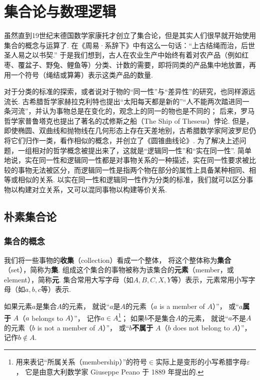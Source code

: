 \chapter{集合论与数理逻辑}
虽然直到19世纪末德国数学家康托才创立了集合论，但是其实人们很早就开始使用集合的概念与运算了.
在《周易·系辞下》中有这么一句话：“上古结绳而治，后世圣人易之以书契.”
于是我们想到，古人在农业生产中始终有着对农产品（例如红枣、覆盆子、野兔、鲤鱼等）分类、计数的需要，即将同类的产品集中地放置，再用一个符号（绳结或算筹）表示这类产品的数量.

对于分类的标准的探索，或者说对于物的“同一性”与“差异性”的研究，也同样源远流长.
古希腊哲学家赫拉克利特也提出“太阳每天都是新的”“人不能两次踏进同一条河流”，并认为事物总是在变化的，观念上的同一的物也是不同的；
后来，罗马哲学家普鲁塔克也提出了著名的忒修斯之船（The Ship of Theseus）悖论.
但是，即使椭圆、双曲线和抛物线在几何形态上存在天差地别，古希腊数学家阿波罗尼仍将它们归作一类，看作相似的概念，并创立了《圆锥曲线论》.
为了解决上述问题，一组相对的哲学概念被提出来了，这就是“逻辑同一性”和“实在同一性”.
简单地说，实在同一性和逻辑同一性都是对事物关系的一种描述，实在同一性要求被比较的事物无法被区分，而逻辑同一性是指两个物在部分的属性上具备某种相同、相等或相似的关系.
以实在同一性和逻辑同一性作为分类的标准，我们就可以区分事物以构建对立关系，又可以混同事物以构建等价关系.

\section{朴素集合论}
\subsection{集合的概念}
\begin{definition}
我们将一些事物的\textbf{收集}（collection）看成一个整体，%
将这个整体称为\textbf{集合}（set），简称为\textbf{集}.
组成这个集合的事物被称为该集合的\textbf{元素}（member，或element），简称\textbf{元}.
集合常用大写字母（如\(A,B,C,X,Y\)等）表示，元素常用小写字母（如\(a,b,c\)等）表示.

如果元素\(a\)是集合\(A\)的元素，%
就说“\(a\)是\(A\)的元素（\(a\) is a member of \(A\)）”，%
或“\(a\)\textbf{属于} \(A\)（\(a\) belongs to \(A\)）”，%
记作\(a \in A\)\footnote{%
用来表记“所属关系（membership）”的符号\(\in\)实际上是变形的小写希腊字母\(\varepsilon\)，%
它是由意大利数学家 Giuseppe Peano 于 1889 年提出的.
}；
如果\(b\)不是集合\(A\)的元素，%
就说“\(a\)不是\(A\)的元素（\(b\) is not a member of \(A\)）”，%
或“\(b\)\textbf{不属于} \(A\)（\(b\) does not belong to \(A\)）”，%
记作\(b \notin A\).
\end{definition}

